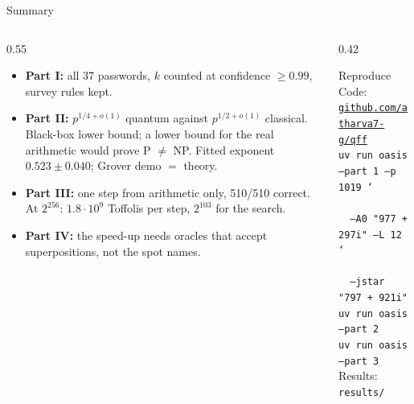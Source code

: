 \documentclass[aspectratio=169,10pt]{beamer}
\begin{document}
\begin{frame}{Summary}
\begin{columns}[T]
\begin{column}{0.55\textwidth}
\begin{itemize}\small
\item \textbf{Part I:} all 37 passwords, $k$ counted at confidence $\ge0.99$, survey rules kept.
\item \textbf{Part II:} $p^{1/4+o(1)}$ quantum against $p^{1/2+o(1)}$ classical. Black-box lower bound; a lower bound for the real arithmetic would prove P $\ne$ NP. Fitted exponent $0.523\pm0.040$; Grover demo $=$ theory.
\item \textbf{Part III:} one step from arithmetic only, 510/510 correct. At $2^{256}$: $1.8\cdot10^9$ Toffolis per step, $2^{103}$ for the search.
\item \textbf{Part IV:} the speed-up needs oracles that accept superpositions, not the spot names.
\end{itemize}
\end{column}
\begin{column}{0.42\textwidth}
\begin{block}{Reproduce}
\scriptsize
Code: \href{https://github.com/atharva7-g/qff}{\texttt{github.com/atharva7-g/qff}}\\[3pt]
\texttt{uv run oasis --part 1 --p 1019 \char`\\}\\
\texttt{\ \ --A0 "977 + 297i" --L 12 \char`\\}\\
\texttt{\ \ --jstar "797 + 921i"}\\
\texttt{uv run oasis --part 2}\\
\texttt{uv run oasis --part 3}\\[3pt]
Results: \texttt{results/}
\end{block}
\end{column}
\end{columns}
\end{frame}
\end{document}
